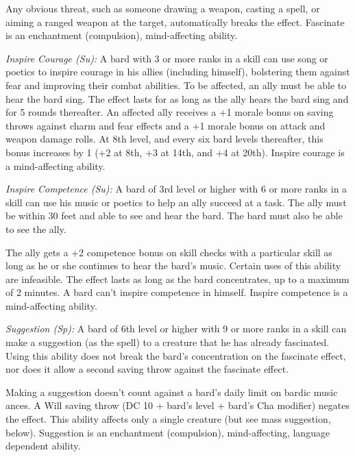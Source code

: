 Any obvious threat, such as someone drawing a weapon, casting a spell, or aiming a ranged weapon at the target, automatically breaks the effect. Fascinate is an enchantment (compulsion), mind-affecting ability.

\textit{Inspire Courage (Su):} A bard with 3 or more ranks in a  skill can use song or poetics to inspire courage in his allies (including himself), bolstering them against fear and improving their combat abilities. To be affected, an ally must be able to hear the bard sing. The effect lasts for as long as the ally hears the bard sing and for 5 rounds thereafter. An affected ally receives a +1 morale bonus on saving throws against charm and fear effects and a +1 morale bonus on attack and weapon damage rolls. At 8th level, and every six bard levels thereafter, this bonus increases by 1 (+2 at 8th, +3 at 14th, and +4 at 20th). Inspire courage is a mind-affecting ability.

\textit{Inspire Competence (Su):} A bard of 3rd level or higher with 6 or more ranks in a  skill can use his music or poetics to help an ally succeed at a task. The ally must be within 30 feet and able to see and hear the bard. The bard must also be able to see the ally.

The ally gets a +2 competence bonus on skill checks with a particular skill as long as he or she continues to hear the bard's music. Certain uses of this ability are infeasible. The effect lasts as long as the bard concentrates, up to a maximum of 2 minutes. A bard can't inspire competence in himself. Inspire competence is a mind-affecting ability.

\textit{Suggestion (Sp):} A bard of 6th level or higher with 9 or more ranks in a  skill can make a suggestion (as the spell) to a creature that he has already fascinated. Using this ability does not break the bard's concentration on the fascinate effect, nor does it allow a second saving throw against the fascinate effect.

Making a suggestion doesn't count against a bard's daily limit on bardic music ances. A Will saving throw (DC 10 + \onehalf bard's level + bard's Cha modifier) negates the effect. This ability affects only a single creature (but see mass suggestion, below). Suggestion is an enchantment (compulsion), mind-affecting, language dependent ability.

